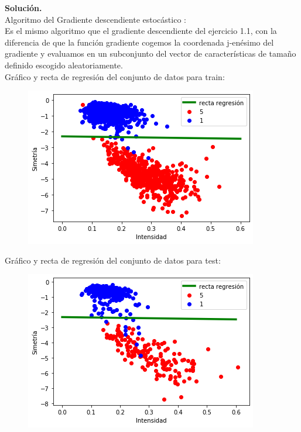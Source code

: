 \documentclass[a4paper,11pt]{article}
\begin{document}
\textbf{Solución.}\\

Algoritmo del \textsf{Gradiente descendiente estocástico} : \\

Es el mismo algoritmo que el gradiente descendiente del ejercicio 1.1, con la diferencia de que la función gradiente cogemos la coordenada j-enésimo del gradiente y evaluamos en un subconjunto del vector de características de tamaño definido escogido aleatoriamente. \\

Gráfico y recta de regresión del conjunto de datos para train:\\

\begin{figure}[h]
\includegraphics[scale=0.5]{grafica1ej2.1}
\centering
\end{figure}

Gráfico y recta de regresión del conjunto de datos para test:\\

\begin{figure}[h]
\includegraphics[scale=0.5]{grafica2ej2.1}
\centering
\end{figure}
\end{document}
